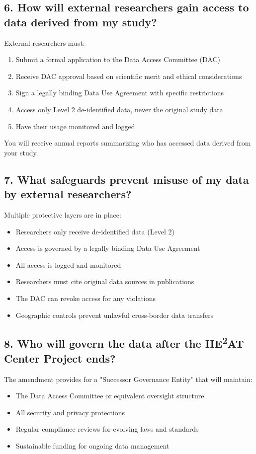 \documentclass[12pt,letterpaper]{article}
\begin{document}
\subsection*{6. How will external researchers gain access to data derived from my study?}

External researchers must:
\begin{enumerate}
\item Submit a formal application to the Data Access Committee (DAC)
\item Receive DAC approval based on scientific merit and ethical considerations
\item Sign a legally binding Data Use Agreement with specific restrictions
\item Access only Level 2 de-identified data, never the original study data
\item Have their usage monitored and logged
\end{enumerate}

You will receive annual reports summarizing who has accessed data derived from your study.

\subsection*{7. What safeguards prevent misuse of my data by external researchers?}

Multiple protective layers are in place:
\begin{itemize}
\item Researchers only receive de-identified data (Level 2)
\item Access is governed by a legally binding Data Use Agreement
\item All access is logged and monitored
\item Researchers must cite original data sources in publications
\item The DAC can revoke access for any violations
\item Geographic controls prevent unlawful cross-border data transfers
\end{itemize}

\subsection*{8. Who will govern the data after the HE\textsuperscript{2}AT Center Project ends?}

The amendment provides for a "Successor Governance Entity" that will maintain:
\begin{itemize}
\item The Data Access Committee or equivalent oversight structure
\item All security and privacy protections
\item Regular compliance reviews for evolving laws and standards
\item Sustainable funding for ongoing data management
\end{itemize}
\end{document}
